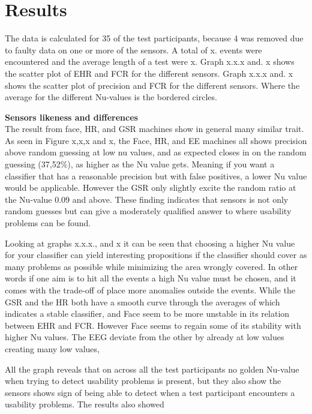 \section{Results}
The data is calculated for 35 of the test participants, because 4 was removed due to faulty data on one or more of the sensors.	
A total of x. events were encountered and the average length of a test were x.
Graph x.x.x and. x shows the scatter plot of EHR and FCR for the different sensors. 
Graph x.x.x and. x shows the scatter plot of precision and FCR for the different sensors. Where the average for the different Nu-values is the bordered circles.



\textbf{Sensors likeness and differences}\\
The result from face, HR, and GSR machines show in general many similar trait.
As seen in Figure x,x,x and x, the Face, HR, and EE machines all shows precision above random guessing at low nu values, and as expected closes in on the random guessing (37,52\%), as higher as the Nu value gets. Meaning if you want a classifier that has a reasonable precision but with false positives, a lower Nu value would be applicable. However the GSR only slightly excite the random ratio at the Nu-value 0.09 and above.
These finding indicates that sensors is not only random guesses but can give a moderately qualified answer to where usability problems can be found.

Looking at graphs x.x.x., and x it can be seen that choosing a higher Nu value for your classifier can yield interesting propositions if the classifier should cover as many problems as possible while minimizing the area wrongly covered.
In other words if one aim is to hit all the events a high Nu value must be chosen, and it comes with the trade-off of place more anomalies outside the events. 
While the GSR and the HR both have a smooth curve through the averages of which indicates a stable classifier, and Face seem to be more unstable in its relation between EHR and FCR. However Face seems to regain some of its stability with higher Nu values. The EEG deviate from the other by already at low values creating many low values, 

All the graph reveals that on across all the test participants no golden Nu-value when trying to detect usability problems is present, but they also show the sensors shows sign of being able to detect when a test participant encounters a usability problems.
The results also showed 
